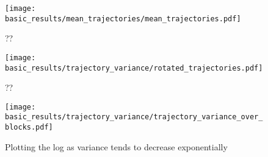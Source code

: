 \documentclass[../main.tex]{subfiles}
\begin{document}
\begin{figure}[H]%
    \centering
    \texttt{[image: basic\_results/mean\_trajectories/mean\_trajectories.pdf]}
    \caption[Mean trajectories]{??}\label{fig:mean_trajectories}
\end{figure}


\begin{figure}[H]%
    \centering
    \texttt{[image: basic\_results/trajectory\_variance/rotated\_trajectories.pdf]}
    \caption[Rotating trajectories]{??}\label{fig:rotated_trajectories}
\end{figure}


\begin{figure}[H]%
    \centering
    \texttt{[image: basic\_results/trajectory\_variance/trajectory\_variance\_over\_blocks.pdf]}
    \caption[Trajectory variance over blocks]{Plotting the log as variance tends to decrease exponentially}\label{fig:trajectory_variance}
\end{figure}







\end{document}
